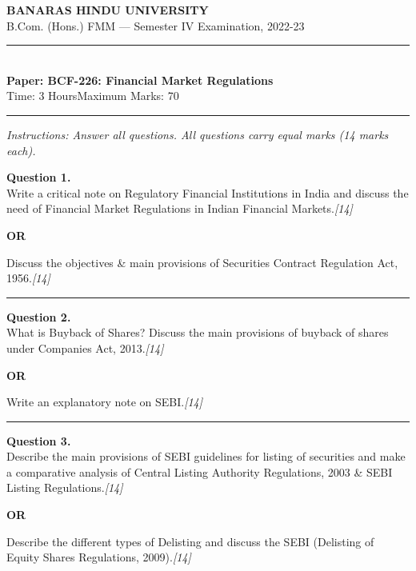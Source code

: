 \documentclass[11pt,a4paper]{article}
\newcommand{\pts}[1]{\hfill   \textit{[#1]}}
\begin{document}
\begin{center}
  {\large\bfseries BANARAS HINDU UNIVERSITY}\\[2pt]
  {\normalsize B.Com. (Hons.) FMM --- Semester IV Examination, 2022-23}\\[6pt]
  \rule{0.8\linewidth}{0.5pt}\\[6pt]
  {\large\bfseries Paper: BCF-226: Financial Market Regulations}\\[4pt]
  {\normalsize Time: 3 Hours\hfill Maximum Marks: 70}
\end{center}

\rule{\linewidth}{0.4pt}

\smallskip



\noindent   \textit{Instructions: Answer all questions. All questions carry equal marks (14 marks each).}

\bigskip




\noindent   \textbf{Question 1.} \\
Write a critical note on Regulatory Financial Institutions in India and discuss the need of Financial Market Regulations in Indian Financial Markets.\pts{14}

\centerline{   \textbf{OR}}

Discuss the objectives \& main provisions of Securities Contract Regulation Act, 1956.\pts{14}

\medskip\rule{\linewidth}{0.2pt}




\noindent   \textbf{Question 2.} \\
What is Buyback of Shares? Discuss the main provisions of buyback of shares under Companies Act, 2013.\pts{14}

\centerline{   \textbf{OR}}

Write an explanatory note on SEBI.\pts{14}

\medskip\rule{\linewidth}{0.2pt}




\noindent   \textbf{Question 3.} \\
Describe the main provisions of SEBI guidelines for listing of securities and make a comparative analysis of Central Listing Authority Regulations, 2003 \& SEBI Listing Regulations.\pts{14}

\centerline{   \textbf{OR}}

Describe the different types of Delisting and discuss the SEBI (Delisting of Equity Shares Regulations, 2009).\pts{14}
\end{document}
